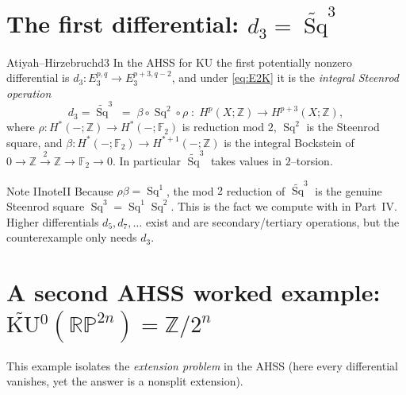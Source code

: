 \documentclass{article}
\newcommand{\F}{{\mathbb{F}}}
\newcommand{\Z}{{\mathbb{Z}}}
\DeclareMathOperator{\Sq}{Sq}
\newcommand{\RP}{\mathbb{RP}}
\newcommand{\KU}{\mathrm{KU}}
\begin{document}
\section{The first differential: $d_3=\widetilde{\Sq}^3$}

\begin{thm}{Atiyah--Hirzebruch}{d3}
In the AHSS for $\KU$ the first potentially nonzero differential is
$d_3\colon E_3^{p,q}\to E_3^{p+3,q-2}$, and under \eqref{eq:E2K} it is the
\emph{integral Steenrod operation}
\[
  d_3=\widetilde{\Sq}^3\;=\;\beta\circ \Sq^2\circ \rho
  \;\colon\; H^{p}(X;\Z)\to H^{p+3}(X;\Z),
\]
where $\rho\colon H^*(-;\Z)\to H^*(-;\F_2)$ is reduction mod $2$, $\Sq^2$ is the
Steenrod square, and $\beta\colon H^*(-;\F_2)\to H^{*+1}(-;\Z)$ is the integral
Bockstein of $0\to\Z\xrightarrow{2}\Z\to\F_2\to 0$. In particular
$\widetilde{\Sq}^3$ takes values in $2$--torsion.
\end{thm}

\begin{titledBox}{Note II}{noteII}
Because $\rho\beta=\Sq^1$, the mod $2$ reduction of $\widetilde{\Sq}^3$ is the
genuine Steenrod square $\Sq^3=\Sq^1\Sq^2$. This is the fact we compute with in
Part~IV. Higher differentials $d_5,d_7,\dots$ exist and are secondary/tertiary
operations, but the counterexample only needs $d_3$.
\end{titledBox}

\section{A second AHSS worked example: $\widetilde{\KU}{}^0(\RP^{2n})=\Z/2^n$}

This example isolates the \emph{extension problem} in the AHSS (here every
differential vanishes, yet the answer is a nonsplit extension).
\end{document}
